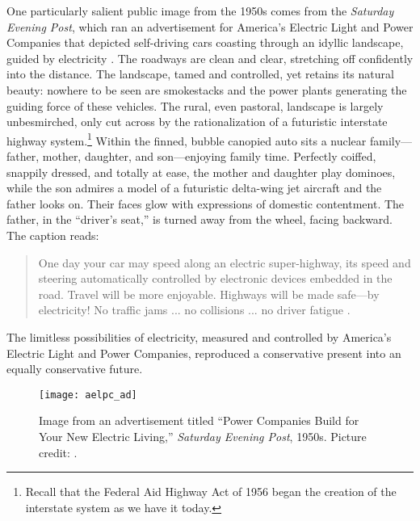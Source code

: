 One particularly salient public image from the 1950s comes from the
\emph{Saturday Evening Post}, which ran an advertisement for America's
Electric Light and Power Companies that depicted self-driving cars
coasting through an idyllic landscape, guided by electricity
\cite{weber}. The roadways 
are clean and clear, stretching off confidently into the distance. The
landscape, tamed and controlled, yet retains its natural beauty:
nowhere to be seen are smokestacks and the power plants generating the
guiding force of these vehicles. The rural, even
pastoral, landscape is largely unbesmirched, only cut across by the
rationalization of a futuristic interstate highway system.\footnote{Recall that
the Federal Aid Highway Act of 1956 began the creation of the
interstate system as we have it today.} Within the finned, bubble
canopied auto sits a nuclear family---father,
mother, daughter, and son---enjoying family time.
Perfectly coiffed, snappily dressed, and totally at ease, the mother
and daughter play dominoes, while the son admires a model of a futuristic
delta-wing jet aircraft and the father looks on. Their faces glow with
expressions of domestic contentment. The father, in the ``driver's
seat,'' is turned away from the wheel, facing backward. The caption reads: 
\begin{quote}
One day your car may speed along an electric super-highway, its speed
and steering automatically controlled by electronic devices embedded
in the road. Travel will be more enjoyable. Highways will be made
safe---by electricity! No traffic jams ... no collisions ... no
driver fatigue \cite{weber}.
\end{quote}
The limitless possibilities of electricity, measured and controlled by
America's Electric Light and Power Companies, reproduced a conservative
present into an equally conservative future. 

\begin{figure}[h]
  \caption{Image from an advertisement titled ``Power Companies Build
    for Your New Electric Living,'' \emph{Saturday Evening Post}, 1950s.
    Picture credit: \cite{novakPicture}.}
  \centering
  \texttt{[image: aelpc\_ad]}
\end{figure}

